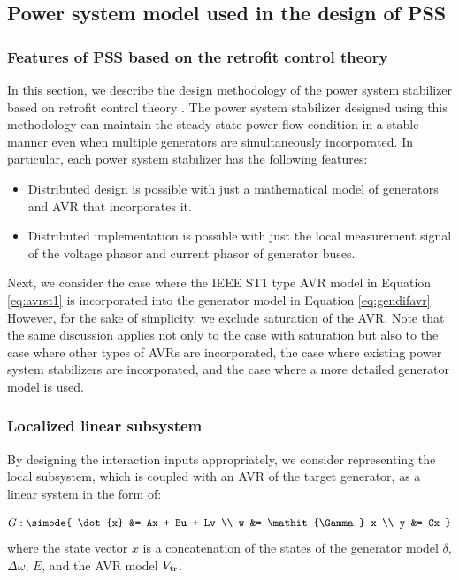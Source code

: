 \documentclass[graybox, envcountchap]{svmult}
\begin{document}
\subsection{Power system model used in the design of PSS\advanced}

\smallskip
\subsubsection{Features of PSS based on the retrofit control theory}

In this section, we describe the design methodology of the power system
stabilizer based on retrofit control theory
\cite{ishizaki2018retrofit,sadamoto2018retrofit,sasahara2019damping,ishizaki2019retrofit,ishizaki2021modularity}.
The power system stabilizer designed using this methodology can maintain the
steady-state power flow condition in a stable manner even when multiple
generators are simultaneously incorporated. In particular, each power system
stabilizer has the following features:

\begin{itemize}
\item Distributed design is possible with just a mathematical model of generators and AVR that incorporates it.
\item Distributed implementation is possible with just the local measurement signal of the voltage phasor and current phasor of generator buses.
\end{itemize}

Next, we consider the case where the IEEE ST1 type AVR model in Equation
\ref{eq:avrst1} is incorporated into the generator model in Equation
\ref{eq:gendifavr}. However, for the sake of simplicity, we exclude saturation
of the AVR. Note that the same discussion applies not only to the case with
saturation but also to the case where other types of AVRs are incorporated, the
case where existing power system stabilizers are incorporated, and the case
where a more detailed generator model is used.

\smallskip
\subsubsection{Localized linear subsystem}
By designing the interaction inputs appropriately, we consider representing the
local subsystem, which is coupled with an AVR of the target generator, as a
linear system in the form of:

\begin{equation}\label{eq:desmodl}
  G:\simode{
  \dot{x} &= Ax + Bu + Lv \\
  w &= \mathit{\Gamma} x \\
  y &= Cx
  }
\end{equation}
where the state vector $x$ is a concatenation of the states of the generator
model $\delta$, $\Delta \omega$, $E$, and the AVR model $V_{\rm tr}$.
\end{document}

